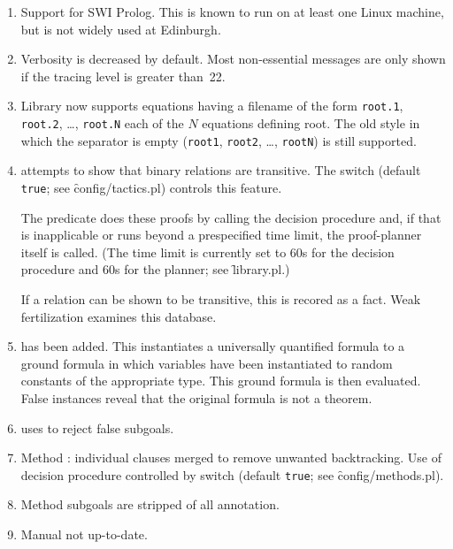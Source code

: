 \begin{enumerate}

        \item  Support for SWI Prolog.  This is known to run on at least
          one Linux machine, but is not widely used at Edinburgh.
        \item  Verbosity is decreased by default.  Most non-essential
          messages are only shown if the tracing level is greater than~22.
        \item  Library now supports equations having a filename of the form 
          {\tt root.1}, {\tt root.2}, \dots, {\tt root.N} each of the $N$ equations defining
          root.  The old style in which the separator is empty ({\tt root1},
          {\tt root2}, \dots, {\tt rootN}) is still supported.
        \item  \clam attempts to show that binary relations are
          transitive.  The switch  (default {\tt true}; see
          \f{config/tactics.pl}) controls this feature.

          The predicate  does these proofs by calling the
          decision procedure and, if that is inapplicable or runs
          beyond a prespecified time limit, the proof-planner itself
          is called.  (The time limit is currently set to 60s for the
          decision procedure and 60s for the planner; see \f{library.pl}.)
          
          If a relation can be shown to be transitive, this is recored
          as a  fact.  Weak fertilization examines
          this database.
        \item  {} has been added.  This instantiates a
          universally quantified formula to a ground formula in which
          variables have been instantiated to random constants of the
          appropriate type.  This ground formula is then evaluated.
          False instances reveal that the original formula is not a
          theorem.   
        \item  {} uses  to
          reject false subgoals.
        \item  Method : individual clauses merged to remove
          unwanted backtracking.  Use of decision procedure controlled
          by  switch (default {\tt true}; see
        \f{config/methods.pl}).
        \item  Method  subgoals are stripped of all annotation.

        \item Manual not up-to-date.

\end{enumerate}

